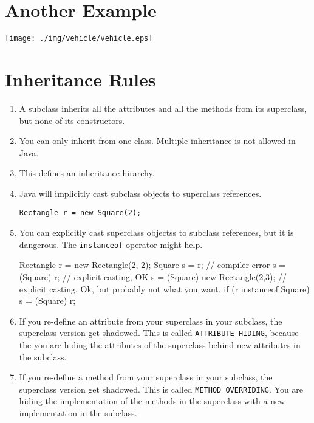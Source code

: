 \documentclass[a4paper, 9pt]{extarticle}
\begin{document}
\section{Another Example}

\begin{center}
  \texttt{[image: ./img/vehicle/vehicle.eps]}
\end{center}

\section{Inheritance Rules}

\begin{enumerate}

  \item A subclass inherits all the attributes and all the methods from its
    superclass, but none of its constructors.

  \item You can only inherit from one class. Multiple inheritance is not
    allowed in Java.

  \item This defines an inheritance hirarchy.

  \item Java will implicitly cast subclass objects to superclass references.

    \verb+Rectangle r = new Square(2);+

  \item You can explicitly cast superclass objectss to subclass references, but
    it is dangerous. The \verb+instanceof+ operator might help.

\begin{blackboard}
Rectangle r = new Rectangle(2, 2);
Square s = r; // compiler error
s = (Square) r; // explicit casting, OK
s = (Square) new Rectangle(2,3); // explicit casting, Ok, but probably not what you want.
if (r instanceof Square) {
  s = (Square) r;
}
\end{blackboard}

  \item If you re-define an attribute from your superclass in your subclass,
    the superclass version get shadowed. This is called
    \verb+ATTRIBUTE HIDING+, because the you are hiding the attributes of the
    superclass behind new attributes in the subclass.

  \item If you re-define a method from your superclass in your subclass, the
    superclass version get shadowed. This is called \verb+METHOD OVERRIDING+.
    You are hiding the implementation of the methods in the superclass with a
    new implementation in the subclass.


\end{enumerate}
\end{document}
